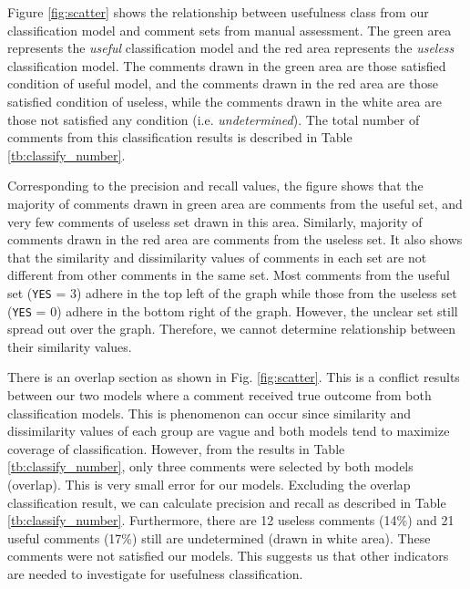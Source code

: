 Figure \ref{fig:scatter} shows the relationship between usefulness class from our classification model and comment sets from manual assessment. 
The green area represents the \emph{useful} classification model and the red area represents the \emph{useless} classification model. The comments drawn in the green area are those satisfied condition of useful model, and the comments drawn in the red area are those satisfied condition of useless, while the comments drawn in the white area are those not satisfied any condition (i.e. \emph{undetermined}). 
The total number of comments from this classification results is described in Table \ref{tb:classify_number}. 



Corresponding to the precision and recall values, the figure shows that the majority of comments drawn in green area are comments from the useful set, and very few comments of useless set drawn in this area.
Similarly, majority of comments drawn in the red area are comments from the useless set.
It also shows that the similarity and dissimilarity values of comments in each set are not different from other comments in the same set.
Most comments from the useful set (\texttt{YES} = 3) adhere in the top left of the graph
while those from the useless set (\texttt{YES} = 0) adhere in the bottom right of the graph.
However, the unclear set still spread out over the graph.
Therefore, we cannot determine relationship between their similarity values.

There is an overlap section as shown in Fig. \ref{fig:scatter}.
This is a conflict results between our two models where a comment received true outcome from both classification models.  
This is phenomenon can occur since similarity and dissimilarity values of each group are vague and both  models tend to maximize coverage of classification.
However, from the results in Table \ref{tb:classify_number}, only three comments were selected by both models (overlap). This is very small error for our models.
Excluding the overlap classification result, we can calculate precision and recall as described in Table \ref{tb:classify_number}. Furthermore, there are 12 useless comments (14\%) and 21 useful comments (17\%) still are undetermined (drawn in white area). These comments were not satisfied our models. This suggests us that other indicators are needed to investigate for usefulness classification.


